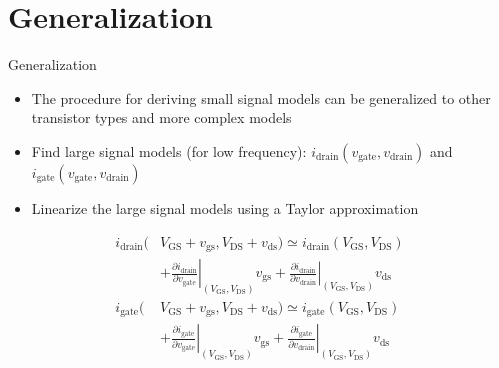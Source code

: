 \section{Generalization}
\begin{frame}{Generalization}
    \begin{itemize}
        \item The procedure for deriving small signal models can be generalized to other 
        transistor types and more complex models
        \item Find large signal models (for low frequency): 
        $i_{\mathrm{drain}}(v_{\mathrm{gate}}, v_{\mathrm{drain}})$ and 
        $i_{\mathrm{gate}}(v_{\mathrm{gate}}, v_{\mathrm{drain}})$
        \item Linearize the large signal models using a Taylor approximation
    \end{itemize}
    \begin{align*}
        i_{\mathrm{drain}}(&V_{\mathrm{GS}}+v_{\mathrm{gs}},
        V_{\mathrm{DS}}+v_{\mathrm{ds}})\simeq i_{\mathrm{drain}}
        (V_{\mathrm{GS}},V_{\mathrm{DS}}) \\
        &+\left.\frac{\partial i_{\mathrm{drain}}}{\partial v_{\mathrm{gate}}}\right|
        _{(V_{\mathrm{GS}},V_{\mathrm{DS}})} v_{\mathrm{gs}} 
        + \left. \frac{\partial i_{\mathrm{drain}}}{\partial v_{\mathrm{drain}}} \right|
        _{(V_{\mathrm{GS}},V_{\mathrm{DS}})} v_{\mathrm{ds}} \\
        i_\mathrm{gate}(&V_{\mathrm{GS}}+v_{\mathrm{gs}},
        V_{\mathrm{DS}}+v_{\mathrm{ds}})\simeq i_{\mathrm{gate}}
        (V_{\mathrm{GS}},V_{\mathrm{DS}}) \\
        &+\left.\frac{\partial i_\mathrm{gate}}{\partial v_{\mathrm{gate}}}\right|
        _{(V_{\mathrm{GS}},V_{\mathrm{DS}})} v_{\mathrm{gs}} 
        + \left. \frac{\partial i_\mathrm{gate}}{\partial v_{\mathrm{drain}}} \right|
        _{(V_{\mathrm{GS}},V_{\mathrm{DS}})} v_{\mathrm{ds}}
    \end{align*}
\end{frame}
